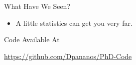 \documentclass[12pt,ignorenonframetext,]{beamer}
\providecommand{\tightlist}{%
	\setlength{\itemsep}{0pt}\setlength{\parskip}{0pt}}
\begin{document}
\begin{frame}{What Have We Seen?}
\protect\hypertarget{what-have-we-seen}{}

\begin{itemize}
\tightlist
\item
  A little statistics can get you very far.
\end{itemize}

\end{frame}

\begin{frame}{Code Available At}
\protect\hypertarget{code-available-at}{}

\url{https://github.com/Dpananos/PhD-Code}

\end{frame}
\end{document}
